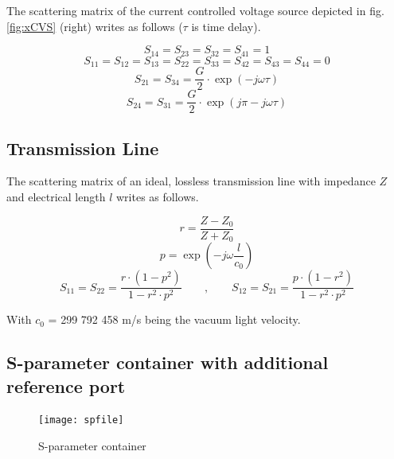 \documentclass[10pt]{report}
\begin{document}
The scattering matrix of the current controlled voltage source
depicted in fig. \ref{fig:xCVS} (right) writes as follows ($\tau$ is
time delay).

\begin{equation}
S_{14} = S_{23} = S_{32} = S_{41} = 1
\end{equation}
\begin{equation}
S_{11} = S_{12} = S_{13} = S_{22} = S_{33} = S_{42} = S_{43} = S_{44} = 0
\end{equation}
\begin{equation}
S_{21} = S_{34} = \frac{G}{2}\cdot \exp\left(-j\omega\tau\right)
\end{equation}
\begin{equation}
S_{24} = S_{31} = \frac{G}{2}\cdot \exp\left(j\pi-j\omega\tau\right)
\end{equation}

\subsection{Transmission Line}

The scattering matrix of an ideal, lossless transmission line with
impedance $Z$ and electrical length $l$ writes as follows.

\begin{equation}
r = \frac{Z-Z_0}{Z+Z_0}
\end{equation}
\begin{equation}
p = \exp\left(-j\omega\frac{l}{c_0}\right)
\end{equation}
\begin{equation}
S_{11} = S_{22} = \frac{r\cdot(1-p^2)}{1-r^2\cdot p^2} \qquad,\qquad
S_{12} = S_{21} = \frac{p\cdot(1-r^2)}{1-r^2\cdot p^2}
\end{equation}

With $c_0$ = 299 792 458 m/s being the vacuum light velocity.

\subsection{S-parameter container with additional reference port}
\label{sec:spfile}

\begin{figure}[ht]
\begin{center}
\texttt{[image: spfile]}
\end{center}
\caption{S-parameter container}
\label{fig:spfile}
\end{figure}
\FloatBarrier
\end{document}

